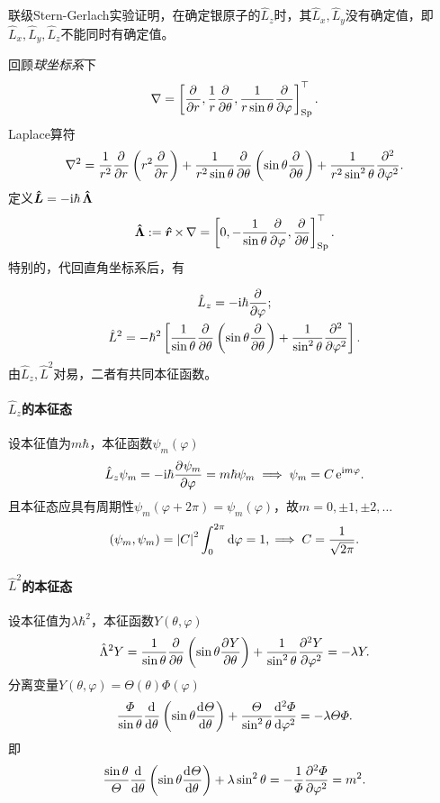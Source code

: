 联级Stern-Gerlach实验证明，在确定银原子的$\hat L_z$时，其$\hat L_x,\hat L_y$没有确定值，即$\hat L_x,\hat L_y,\hat L_z$不能同时有确定值。

回顾\textit{球坐标系}下
\[
	\nabla=\fkh{\pp r,\frac1r\pp\theta,\frac1{r\sin\theta}\pp\varphi}\tp_\mathrm{Sp}.
\]
Laplace算符
\[
	\nabla^2=\frac1{r^2}\pp r\kh{r^2\pp r}+\frac1{r^2\sin\theta}\pp\theta\kh{\sin\theta\pp\theta}+\frac1{r^2\sin^2\theta}\pp[2]\varphi.
\]
定义$\qo L=-\i\hbar\,\qo\Lambda$
\[
	\qo\Lambda:=\qo r\times\,\nabla=\fkh{0,-\frac1{\sin\theta}\pp\varphi,\pp\theta}\tp_\mathrm{Sp}.
\]
特别的，代回直角坐标系后，有
\iffalse
	\begin{align*}
		\hat L_x & =\i\hbar\kh{+\sin\varphi\pp\theta+\cot\theta\cos\varphi\pp\varphi} \\
		\hat L_y & =\i\hbar\kh{-\cos\varphi\pp\theta+\cot\theta\sin\varphi\pp\varphi} \\
		\hat L_z & =-\i\hbar\pp\varphi.
	\end{align*}
\fi
\begin{gather}
	\hat L_z=-\i\hbar\pp\varphi;\\
	\hat L^2=-\hbar^2\fkh{\frac1{\sin\theta}\pp\theta\kh{\sin\theta\pp\theta}+\frac1{\sin^2\theta}\pp[2]\varphi}.
\end{gather}
由$\hat L_z,\hat L^2$对易，二者有共同本征函数。
\paragraph{$\hat L_z$的本征态}设本征值为$m\hbar$，本征函数$\psi_m(\varphi)$
\[
	\hat L_z\psi_m=-\i\hbar\pv{\psi_m}\varphi=m\hbar\psi_m\implies\psi_m=C\e{\i m\varphi}.
\]
且本征态应具有周期性$\psi_m(\varphi+2\pi)=\psi_m(\varphi)$，故$m=0,\pm 1,\pm 2,\ldots$
\[
	(\psi_m,\psi_m)=\abs C^2\int_0^{2\pi}\d\varphi=1,\implies C=\frac1{\sqrt{2\pi}}.
\]
\paragraph{$\hat L^2$的本征态}设本征值为$\lambda\hbar^2$，本征函数$Y(\theta,\varphi)$
\[
	\hat\Lambda^2Y=\frac1{\sin\theta}\pp\theta\kh{\sin\theta\pv Y\theta}+\frac1{\sin^2\theta}\pv[2]Y\varphi=-\lambda Y.
\]
分离变量$Y(\theta,\varphi)=\varTheta(\theta)\varPhi(\varphi)$
\[
	\frac\varPhi{\sin\theta}\dd\theta\kh{\sin\theta\dv\varTheta\theta}+\frac\varTheta{\sin^2\theta}\dv[2]\varPhi\varphi=-\lambda\varTheta\varPhi.
\]
即
\[
	\frac{\sin\theta}\varTheta\dd\theta\kh{\sin\theta\dv\varTheta\theta}+\lambda\sin^2\theta=-\frac1\varPhi\pv[2]\varPhi\varphi=m^2.
\]

